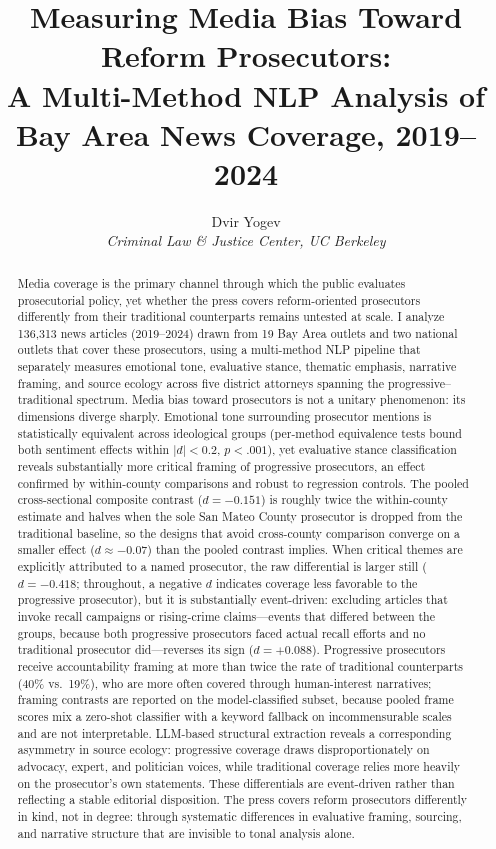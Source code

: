\documentclass[12pt, letterpaper]{article}
\title{Measuring Media Bias Toward Reform Prosecutors:\\
A Multi-Method NLP Analysis of Bay Area News Coverage, 2019--2024}
\author{Dvir Yogev\\[4pt]
\textit{Criminal Law \& Justice Center, UC Berkeley}}
\date{}
\begin{document}
\maketitle
\thispagestyle{empty}

\begin{abstract}
\noindent
Media coverage is the primary channel through which the public evaluates prosecutorial policy, yet whether the press covers reform-oriented prosecutors differently from their traditional counterparts remains untested at scale. I analyze 136,313 news articles (2019--2024) drawn from 19 Bay Area outlets and two national outlets that cover these prosecutors, using a multi-method NLP pipeline that separately measures emotional tone, evaluative stance, thematic emphasis, narrative framing, and source ecology across five district attorneys spanning the progressive--traditional spectrum. Media bias toward prosecutors is not a unitary phenomenon: its dimensions diverge sharply. Emotional tone surrounding prosecutor mentions is statistically equivalent across ideological groups (per-method equivalence tests bound both sentiment effects within $|d| < 0.2$, $p < .001$), yet evaluative stance classification reveals substantially more critical framing of progressive prosecutors, an effect confirmed by within-county comparisons and robust to regression controls. The pooled cross-sectional composite contrast ($d = -0.151$) is roughly twice the within-county estimate and halves when the sole San Mateo County prosecutor is dropped from the traditional baseline, so the designs that avoid cross-county comparison converge on a smaller effect ($d \approx -0.07$) than the pooled contrast implies. When critical themes are explicitly attributed to a named prosecutor, the raw differential is larger still ($d = -0.418$; throughout, a negative $d$ indicates coverage less favorable to the progressive prosecutor), but it is substantially event-driven: excluding articles that invoke recall campaigns or rising-crime claims---events that differed between the groups, because both progressive prosecutors faced actual recall efforts and no traditional prosecutor did---reverses its sign ($d = +0.088$). Progressive prosecutors receive accountability framing at more than twice the rate of traditional counterparts (40\% vs.\ 19\%), who are more often covered through human-interest narratives; framing contrasts are reported on the model-classified subset, because pooled frame scores mix a zero-shot classifier with a keyword fallback on incommensurable scales and are not interpretable. LLM-based structural extraction reveals a corresponding asymmetry in source ecology: progressive coverage draws disproportionately on advocacy, expert, and politician voices, while traditional coverage relies more heavily on the prosecutor's own statements. These differentials are event-driven rather than reflecting a stable editorial disposition. The press covers reform prosecutors differently in kind, not in degree: through systematic differences in evaluative framing, sourcing, and narrative structure that are invisible to tonal analysis alone.
\end{abstract}
\end{document}
